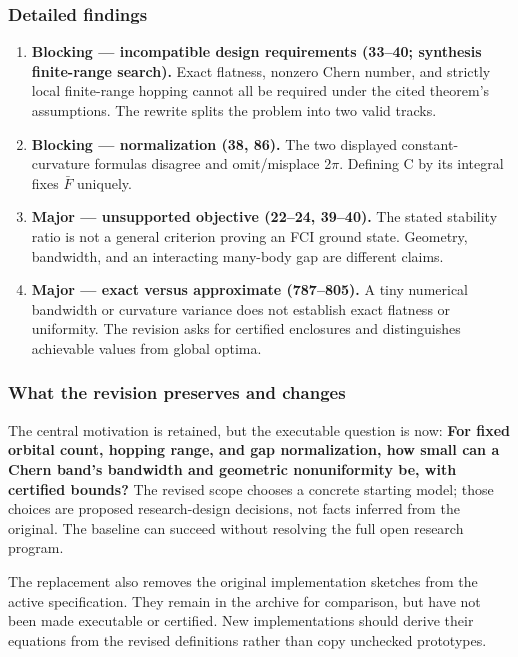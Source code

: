 \documentclass[
  11pt,
]{article}
\begin{document}
\subsubsection{Detailed findings}

\begin{enumerate}
\def\labelenumi{\arabic{enumi}.}
\item
  \textbf{Blocking --- incompatible design requirements (33--40;
  synthesis finite-range search).} Exact flatness, nonzero Chern number,
  and strictly local finite-range hopping cannot all be required under
  the cited theorem's assumptions. The rewrite splits the problem into
  two valid tracks.
\item
  \textbf{Blocking --- normalization (38, 86).} The two displayed
  constant-curvature formulas disagree and omit/misplace
  2\ensuremath{\pi}. Defining C by its integral fixes
  \ensuremath{\bar{F}} uniquely.
\item
  \textbf{Major --- unsupported objective (22--24, 39--40).} The stated
  stability ratio is not a general criterion proving an FCI ground
  state. Geometry, bandwidth, and an interacting many-body gap are
  different claims.
\item
  \textbf{Major --- exact versus approximate (787--805).} A tiny
  numerical bandwidth or curvature variance does not establish exact
  flatness or uniformity. The revision asks for certified enclosures and
  distinguishes achievable values from global optima.
\end{enumerate}

\subsubsection{What the revision preserves and changes}

The central motivation is retained, but the executable question is now:
\textbf{For fixed orbital count, hopping range, and gap normalization,
how small can a Chern band's bandwidth and geometric nonuniformity be,
with certified bounds?} The revised scope chooses a concrete starting
model; those choices are proposed research-design decisions, not facts
inferred from the original. The baseline can succeed without resolving
the full open research program.

The replacement also removes the original implementation sketches from
the active specification. They remain in the archive for comparison, but
have not been made executable or certified. New implementations should
derive their equations from the revised definitions rather than copy
unchecked prototypes.
\end{document}
